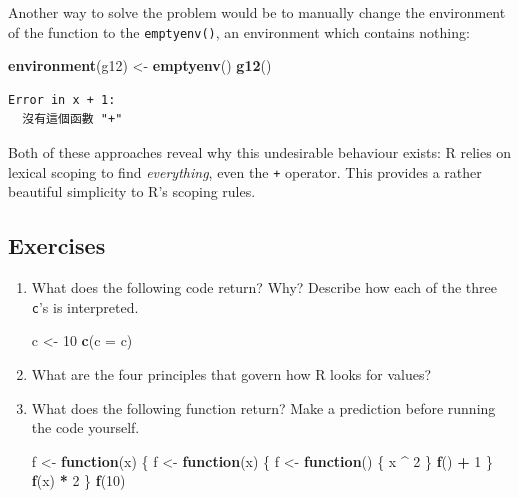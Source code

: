 \documentclass[]{book}
\newenvironment{Shaded}{\begin{snugshade}}{\end{snugshade}}
\newcommand{\ControlFlowTok}[1]{\textcolor[rgb]{0.13,0.29,0.53}{\textbf{#1}}}
\newcommand{\DataTypeTok}[1]{\textcolor[rgb]{0.13,0.29,0.53}{#1}}
\newcommand{\DecValTok}[1]{\textcolor[rgb]{0.00,0.00,0.81}{#1}}
\newcommand{\KeywordTok}[1]{\textcolor[rgb]{0.13,0.29,0.53}{\textbf{#1}}}
\newcommand{\NormalTok}[1]{#1}
\newcommand{\OperatorTok}[1]{\textcolor[rgb]{0.81,0.36,0.00}{\textbf{#1}}}
\newcommand{\StringTok}[1]{\textcolor[rgb]{0.31,0.60,0.02}{#1}}
\theoremstyle{definition}
\theoremstyle{definition}
\theoremstyle{definition}
\theoremstyle{remark}
\begin{document}
Another way to solve the problem would be to manually change the
environment of the function to the \texttt{emptyenv()}, an environment
which contains nothing:

\begin{Shaded}
\begin{Highlighting}[]
\KeywordTok{environment}\NormalTok{(g12) <-}\StringTok{ }\KeywordTok{emptyenv}\NormalTok{()}
\KeywordTok{g12}\NormalTok{()}
\end{Highlighting}
\end{Shaded}

\begin{verbatim}
Error in x + 1:
  沒有這個函數 "+"
\end{verbatim}

Both of these approaches reveal why this undesirable behaviour exists: R
relies on lexical scoping to find \emph{everything}, even the \texttt{+}
operator. This provides a rather beautiful simplicity to R's scoping
rules.

\hypertarget{exercises-1}{%
\subsection{Exercises}\label{exercises-1}}

\begin{enumerate}
\def\labelenumi{\arabic{enumi}.}
\item
  What does the following code return? Why? Describe how each of the
  three \texttt{c}'s is interpreted.

\begin{Shaded}
\begin{Highlighting}[]
\NormalTok{c <-}\StringTok{ }\DecValTok{10}
\KeywordTok{c}\NormalTok{(}\DataTypeTok{c =}\NormalTok{ c)}
\end{Highlighting}
\end{Shaded}
\item
  What are the four principles that govern how R looks for values?
\item
  What does the following function return? Make a prediction before
  running the code yourself.

\begin{Shaded}
\begin{Highlighting}[]
\NormalTok{f <-}\StringTok{ }\ControlFlowTok{function}\NormalTok{(x) \{}
\NormalTok{  f <-}\StringTok{ }\ControlFlowTok{function}\NormalTok{(x) \{}
\NormalTok{    f <-}\StringTok{ }\ControlFlowTok{function}\NormalTok{() \{}
\NormalTok{      x }\OperatorTok{^}\StringTok{ }\DecValTok{2}
\NormalTok{    \}}
    \KeywordTok{f}\NormalTok{() }\OperatorTok{+}\StringTok{ }\DecValTok{1}
\NormalTok{  \}}
  \KeywordTok{f}\NormalTok{(x) }\OperatorTok{*}\StringTok{ }\DecValTok{2}
\NormalTok{\}}
\KeywordTok{f}\NormalTok{(}\DecValTok{10}\NormalTok{)}
\end{Highlighting}
\end{Shaded}
\end{enumerate}
\end{document}
